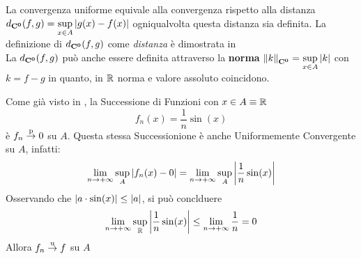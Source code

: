 \begin{observation}
	\label{obs:dist_conv_unif}
	La convergenza uniforme equivale alla convergenza rispetto alla distanza $d_{\mathbf{C^{0}}}(f,g)=\sup\limits_{x\in A}\left|g(x)-f(x)\right|$ ogniqualvolta questa distanza sia definita. La definizione di $d_{\mathbf{C^{0}}}(f,g)$ come \textit{distanza} è dimostrata in \hyperref[ex:dim_dist_conv_unif]{}\\
	La $d_{\mathbf{C^{0}}}(f,g)$ può anche essere definita attraverso la \textbf{norma} $\left\|k\right\|_{\mathbf{C^{0}}}=\sup\limits_{x\in A}\left|k\right|$ con $k = f-g$ in quanto, in $\mathbb{R}$ norma e valore assoluto coincidono.
\end{observation}
\begin{example}
	Come già visto in , la Successione di Funzioni con $x \in A \equiv \mathbb{R}$
	\[f_n(x) = \frac{1}{n} \sin(x)\]
	è $f_n \overset{\text{p}}{\to} 0$ su $A$. Questa stessa Successionione è anche Uniformemente Convergente su $A$, infatti:
	\[
		\lim\limits_{n \to +\infty} \sup\limits_{A} \left|f_n(x) - 0\right| =
		\lim\limits_{n \to +\infty} \sup\limits_{A} \left|\frac{1}{n} \sin(x)\right|
	\]
	Osservando che $\left|a \cdot \sin(x)\right| \leq \left|a\right|$, si può conclduere
	\[
		\lim\limits_{n \to +\infty} \sup\limits_{\mathbb{R}} \left|\frac{1}{n} \sin(x)\right| \leq
		\lim\limits_{n \to +\infty} \frac{1}{n}=0
	\]
	Allora $f_n \overset{\text{u}}{\to} f$ su $A$
\end{example}

